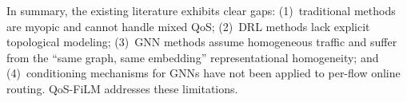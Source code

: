 In summary, the existing literature exhibits clear gaps: (1)~traditional methods are myopic and cannot handle mixed QoS; (2)~DRL methods lack explicit topological modeling; (3)~GNN methods assume homogeneous traffic and suffer from the ``same graph, same embedding'' representational homogeneity; and (4)~conditioning mechanisms for GNNs have not been applied to per-flow online routing. QoS-FiLM addresses these limitations.
